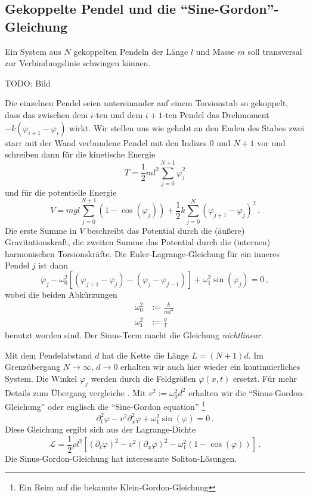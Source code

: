 \documentclass[paper=a4, fontsize=11.0pt, abstractoff, DIV12]{scrartcl}
\newcommand{\LD}{\ensuremath{\mathcal{L}}}
\begin{document}
\subsection{Gekoppelte Pendel und die ``Sine-Gordon''-Gleichung}

Ein System aus $N$ gekoppelten Pendeln der Länge $l$ und Masse $m$ soll
transversal zur Verbindungslinie schwingen können.

TODO: Bild

Die einzelnen Pendel seien untereinander auf einem Torsionstab so gekoppelt,
dass das zwischen dem $i$-ten und dem $i+1$-ten Pendel das Drehmoment
$-k(\varphi_{i+1} - \varphi_i)$ wirkt. Wir stellen uns wie gehabt an den
Enden des Stabes zwei starr mit der Wand verbundene Pendel mit den Indizes
$0$ und $N+1$ vor und schreiben dann für die kinetische Energie
\begin{equation}
T = \frac{1}{2}ml^2\sum\limits_{j=0}^{N+1}\dot\varphi_j^2
\end{equation}
und für die potentielle Energie
\begin{equation}
V = mgl\sum\limits_{j=0}^{N+1}(1-\cos(\varphi_j)) + \frac{1}{2}k\sum\limits_{j=0}^{N}\left(\varphi_{j+1} - \varphi_j\right)^2\,.
\end{equation}
Die erste Summe in $V$ beschreibt das Potential durch die (äußere)
Gravitationskraft, die zweiten Summe das Potential durch die (internen)
harmonischen Torsionskräfte. Die Euler-Lagrange-Gleichung für ein inneres
Pendel $j$ ist dann
\begin{equation}
\ddot\varphi_{j} - \omega_0^2\left[(\varphi_{j+1} - \varphi_{j}) - (\varphi_{j}-\varphi_{j-1})\right] + \omega_1^2\sin(\varphi_j) = 0\,,
\end{equation}
wobei die beiden Abkürzungen
\begin{align}
\omega_0^2 &:= \frac{k}{ml^2}\nonumber\,\\
\omega_1^2 &:= \frac{g}{l}\nonumber
\end{align}
benutzt worden sind. Der Sinus-Term macht die Gleichung \emph{nichtlinear}.

Mit dem Pendelabstand $d$ hat die Kette die Länge $L=(N+1)d$. Im
Grenzübergang $N\to\infty$, $d\to 0$ erhalten wir auch hier wieder ein
kontinuierliches System. Die Winkel $\varphi_j$ werden durch die Feldgrößen
$\varphi(x,t)$ ersetzt. Für mehr Details zum Übergang vergleiche \cite
{Scheck}. Mit $v^2:=\omega_0^2 d^2$ erhalten wir die
``Sinus-Gordon-Gleichung'' oder englisch die ``Sine-Gordon equation''
\footnote{Ein Reim auf die bekannte Klein-Gordon-Gleichung}
\begin{equation}
\partial_t^2\varphi - v^2\partial_x^2\varphi + \omega_1^2\sin(\varphi) = 0\,.
\end{equation}
Diese Gleichung ergibt sich aus der Lagrange-Dichte
\begin{equation}
\LD = \frac{1}{2}\rho l^2\left[ (\partial_t \varphi)^2 - v^2 (\partial_x \varphi)^2 - \omega_1^2(1-\cos(\varphi))\right]\,.
\end{equation}
Die Sinus-Gordon-Gleichung hat interessante Soliton-Lösungen.
\end{document}

